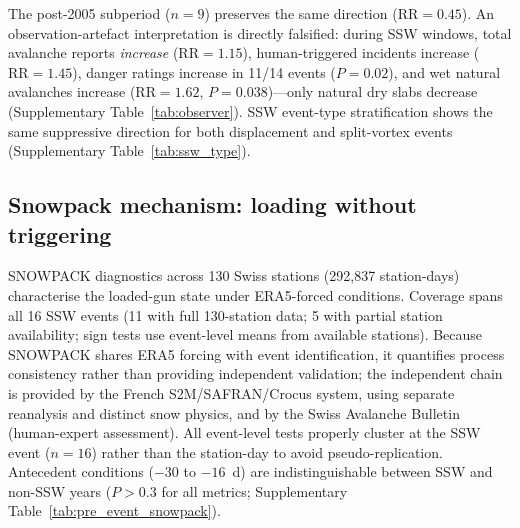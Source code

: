 \documentclass[11pt,letterpaper]{article}
\begin{document}
The post-2005 subperiod ($n = 9$) preserves the same direction ($\mathrm{RR} = 0.45$). An observation-artefact interpretation is directly falsified: during SSW windows, total avalanche reports \emph{increase} ($\mathrm{RR} = 1.15$), human-triggered incidents increase ($\mathrm{RR} = 1.45$), danger ratings increase in 11/14 events ($P = 0.02$), and wet natural avalanches increase ($\mathrm{RR} = 1.62$, $P = 0.038$)---only natural dry slabs decrease (Supplementary Table~\ref{tab:observer}). SSW event-type stratification shows the same suppressive direction for both displacement and split-vortex events (Supplementary Table~\ref{tab:ssw_type}).

\subsection*{Snowpack mechanism: loading without triggering}

SNOWPACK diagnostics across 130 Swiss stations (292,837 station-days) characterise the loaded-gun state under ERA5-forced conditions. Coverage spans all 16 SSW events (11 with full 130-station data; 5 with partial station availability; sign tests use event-level means from available stations). Because SNOWPACK shares ERA5 forcing with event identification, it quantifies process consistency rather than providing independent validation; the independent chain is provided by the French S2M/SAFRAN/Crocus system\cite{Vernay2022}, using separate reanalysis and distinct snow physics, and by the Swiss Avalanche Bulletin (human-expert assessment). All event-level tests properly cluster at the SSW event ($n = 16$) rather than the station-day to avoid pseudo-replication. Antecedent conditions ($-30$ to $-16$~d) are indistinguishable between SSW and non-SSW years ($P > 0.3$ for all metrics; Supplementary Table~\ref{tab:pre_event_snowpack}).
\end{document}
